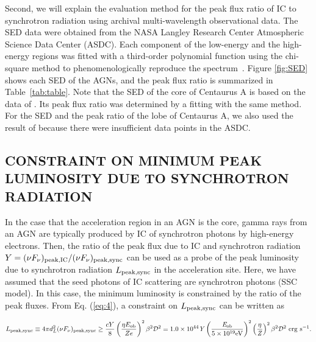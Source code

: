 \documentclass{aastex6}
\begin{document}
Second, we will explain the evaluation method for the peak flux ratio of IC to synchrotron radiation using archival multi-wavelength observational data.
The SED data were obtained from the NASA Langley Research Center Atmospheric Science Data Center (ASDC).
Each component of the low-energy and the high-energy regions was fitted with a third-order polynomial function using the chi-square method to phenomenologically reproduce the spectrum~\citep{kubo}.
Figure \ref{fig:SED} shows each SED of the AGNs, and the peak flux ratio is summarized in Table~\ref{tab:table}.
Note that the SED of the core of Centaurus A is based on the data of \cite{CenAcore}.
Its peak flux ratio was determined by a fitting with the same method.
For the SED and the peak ratio of the lobe of Centaurus A, we also used the result of \cite{CenAlobe} because there were insufficient data points in the ASDC.

\subsection{CONSTRAINT ON MINIMUM PEAK LUMINOSITY DUE TO SYNCHROTRON RADIATION}
\label{sec:core}

In the case that the acceleration region in an AGN is the core, gamma rays from an AGN are typically produced by IC of synchrotron photons by high-energy electrons.
Then, the ratio of the peak flux due to IC and synchrotron radiation $Y = (\nu F_{\nu})_{\rm{peak,IC}}/(\nu F_{\nu})_{\rm{peak,sync}}$ can be used as a probe of the peak luminosity due to synchrotron radiation $L_{\rm{peak,sync}}$ in the acceleration site.
Here, we have assumed that the seed photons of IC scattering are synchrotron photons (SSC model).
In this case, the minimum luminosity is constrained by the ratio of the peak fluxes.
From Eq. (\ref{eq:4}), a constraint on $L_{\rm peak,sync}$ can be written as

\begin{equation}
L_{\rm peak, sync} \equiv 4\pi d^{2}_{L}(\nu F_{\nu})_{\rm{peak,sync}} \geq \frac{cY}{8}\left(\frac{\eta E_{\rm{ob}}}{Ze}\right)^{2}\beta^{2}\cal{D}\rm^{2} = 1.0 \times 10^{44}\it{Y}\left(\frac{E_{\rm ob}}{\rm{5\times10^{19}eV}}\right)\rm^{2}\left(\frac{\eta}{\it{Z}}\right)\rm^{2}\beta^{2}\cal{D}\rm{}^{2}~\rm{erg~s^{-1}}.
\label{eq:core}
\end{equation}
\end{document}
